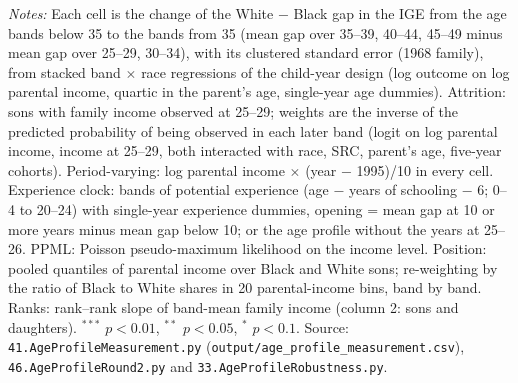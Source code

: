 \begin{table}[!htbp]
\begin{minipage}{\textwidth}\footnotesize \textit{Notes:} Each cell is the change of the White $-$ Black gap in the IGE from the age bands below 35 to the bands from 35 (mean gap over 35--39, 40--44, 45--49 minus mean gap over 25--29, 30--34), with its clustered standard error (1968 family), from stacked band $\times$ race regressions of the child-year design (log outcome on log parental income, quartic in the parent's age, single-year age dummies). Attrition: sons with family income observed at 25--29; weights are the inverse of the predicted probability of being observed in each later band (logit on log parental income, income at 25--29, both interacted with race, SRC, parent's age, five-year cohorts). Period-varying: log parental income $\times$ (year $-$ 1995)/10 in every cell. Experience clock: bands of potential experience (age $-$ years of schooling $-$ 6; 0--4 to 20--24) with single-year experience dummies, opening = mean gap at 10 or more years minus mean gap below 10; or the age profile without the years at 25--26. PPML: Poisson pseudo-maximum likelihood on the income level. Position: pooled quantiles of parental income over Black and White sons; re-weighting by the ratio of Black to White shares in 20 parental-income bins, band by band. Ranks: rank--rank slope of band-mean family income (column 2: sons and daughters). $^{***}$ $p<0.01$, $^{**}$ $p<0.05$, $^{*}$ $p<0.1$. Source: \texttt{41.AgeProfileMeasurement.py} (\texttt{output/age\_profile\_measurement.csv}), \texttt{46.AgeProfileRound2.py} and \texttt{33.AgeProfileRobustness.py}.\end{minipage}
\end{table}
